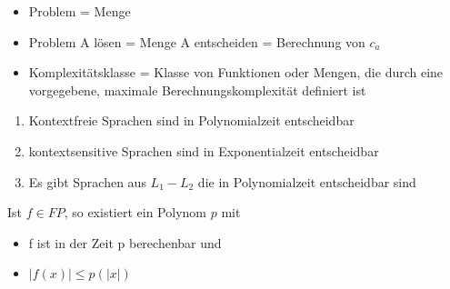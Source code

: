 \documentclass[14pt]{article}
\begin{document}
\begin{eigenschaft}[Terminologie]
    \begin{itemize}
        \item Problem = Menge
        \item Problem A lösen = Menge A entscheiden = Berechnung von $c_a$
        \item Komplexitätsklasse = Klasse von Funktionen oder Mengen, die durch 
        eine vorgegebene, maximale Berechnungskomplexität definiert ist
    \end{itemize}
\end{eigenschaft}
\begin{eigenschaft}
    \begin{enumerate}
        \item Kontextfreie Sprachen sind in Polynomialzeit entscheidbar
        \item kontextsensitive Sprachen sind in Exponentialzeit entscheidbar
        \item Es gibt Sprachen aus $L_1 - L_2$ die in Polynomialzeit entscheidbar sind
    \end{enumerate}
\end{eigenschaft}
\begin{eigenschaft}
    Ist $f \in FP$, so existiert ein Polynom $p$ mit 
    \begin{itemize}
        \item f ist in der Zeit p berechenbar und
        \item $|f(x)| \leq p(|x|)$
    \end{itemize}
\end{eigenschaft}
\end{document}
